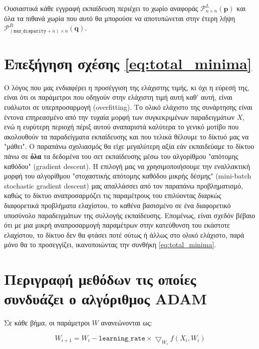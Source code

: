 Ουσιαστικά κάθε εγγραφή εκπαίδευση περιέχει το χωρίο αναφοράς $\mathcal{P}_{n \times n}^L(\mathbf{p})$ και όλα τα πιθανά χωρία που αυτό θα μπορούσε να αποτυπώνεται στην έτερη λήψη \e $\mathcal{P}_{( \texttt{max\_disparity} + n) \times n}^R(\mathbf{q})$. \g

\section{Επεξήγηση σχέσης \ref{eq:total_minima}}
\label{appendix:minimum_explanation}

Ο λόγος που μας ενδιαφέρει η προσέγγιση της ελάχιστης τιμής, κι όχι η εύρεσή της, είναι ότι οι παράμετροι που οδηγούν στην ελάχιστη τιμή αυτή καθ' αυτή, είναι ευάλωτοι σε υπερπροσαρμογή \e (overfitting). \g Το ολικό ελάχιστο της συνάρτησης είναι έντονα επηρεασμένο από την τυχαία μορφή των συγκεκριμένων παραδειγμάτων $X$, ενώ η ευρύτερη περιοχή πέριξ αυτού αναπαριστά καλύτερα το γενικό μοτίβο που ακολουθούν τα παραδείγματα εκπαίδευσης και που τελικά θέλουμε το δίκτυό μας να "μάθει". Ο παραπάνω σχολιασμός θα είχε μεγαλύτερη αξία εάν εκπαιδεύαμε το δίκτυο πάνω σε \textbf{όλα} τα δεδομένα του σετ εκπαίδευσης μέσω του αλγορίθμου "απότομης καθόδου" \e (gradient descent). \g Η επιλογή μας να χρησιμοποιήσουμε την εναλλακτική μορφή του αλγορίθμου "στοχαστικής απότομης καθόδου μικρής δέσμης" \e (mini-batch stochastic gradient descent) \g μας απαλλάσσει από τον παραπάνω προβληματισμό, καθώς το δίκτυο αναπροσαρμόζει τις παραμέτρους του επιλύοντας διαρκώς διαφορετικά προβλήματα ελαχίστου, το καθένα βασισμένο σε ένα διαφορετικό υποσύνολο παραδειγμάτων της συλλογής εκπαίδευσης. Επομένως, είναι σχεδόν βέβαιο ότι με μια μικρή αναπροσαρμογή παραμέτρων στην κατεύθυνση του εκάστοτε ελαχίστου, το δίκτυο δεν θα φτάσει ποτέ ούτως ή άλλως στο ολικό ελάχιστο, παρά μόνο θα το προσεγγίζει, ικανοποιώντας την συνθήκη \ref{eq:total_minima}.

\section{Περιγραφή μεθόδων τις οποίες συνδυάζει ο αλγόριθμος \texorpdfstring{\e ADAM \g}{TEXT}}
\label{appendix:adam_explanation}

Σε κάθε βήμα, οι παράμετροι $W$ ανανεώνονται ως:

$$W_{i+1} = W_i - \mathtt{learning\_rate} \times \bigtriangledown_{W_i}f(X_i,W_i)$$

